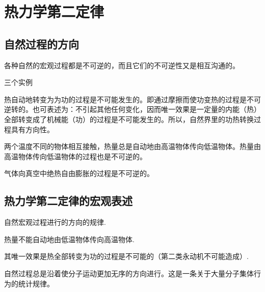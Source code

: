 \chapter{热力学第二定律}
\thispagestyle{empty}
\section{自然过程的方向}
\thispagestyle{empty}
各种自然的宏观过程都是不可逆的，而且它们的不可逆性又是相互沟通的。
\par 三个实例\jg
{}
\par {}  热自动地转变为为功的过程是不可能发生的。即通过摩擦而使功变热的过程是不可逆转的。也可表述为：不引起其他任何变化，因而唯一效果是一定量的内能（热）全部转变成了机械能（功）的过程是不可能发生的。所以，自然界里的功热转换过程具有方向性。\jg
\par {} 两个温度不同的物体相互接触，热量总是自动地由高温物体传向低温物体。热量由高温物体传向低温物体的过程也是不可逆的。\jg
\par \dya[气体的绝热自由膨胀] 气体向真空中绝热自由膨胀的过程是不可逆的。

\section{热力学第二定律的宏观表述}
 自然宏观过程进行的方向的规律.\jg
{}
\par \dya[克劳休斯表述] 热量不能自动地由低温物体传向高温物体.\jg
\par \dya[开尔文表述] 其唯一效果是热全部转变为功的过程是不可能的（第二类永动机不可能造成）.\jg
\par \dya[微观意义] 自然过程总是沿着使分子运动更加无序的方向进行。这是一条关于大量分子集体行为的统计规律。

